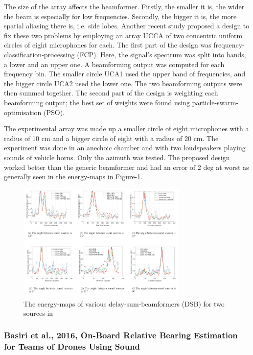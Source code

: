 \documentclass[notitlepage]{report}
\begin{document}
The size of the array affects the beamformer. Firstly, the smaller it is, the wider the beam is especially for low frequencies. Secondly, the bigger it is, the more spatial aliasing there is, i.e. side lobes. Another recent study \cite{zhang_improved_2021} proposed a design to fix these two problems by employing an array UCCA of two concentric uniform circles of eight microphones for each. The first part of the design was frequency-classification-processing (FCP). Here, the signal's spectrum was split into bands, a lower and an upper one. A beamforming output was computed for each frequency bin. The smaller circle UCA1 used the upper band of frequencies, and the bigger circle UCA2 used the lower one. The two beamforming outputs were then summed together. The second part of the design is weighting each beamforming output; the best set of weights were found using particle-swarm-optimisation (PSO). 

The experimental array was made up a smaller circle of eight microphones with a radius of 10 \si{cm} and a bigger circle of eight with a radius of 20 \si{cm}. The experiment was done in an anechoic chamber and with two loudspeakers playing sounds of vehicle horns. Only the azimuth was tested. The proposed design worked better than the generic beamformer and had an error of 2 \si{deg} at worst as generally seen in the energy-maps in Figure-\ref{fig:zhang_2021_maps}.

\begin{figure}[H]
\includegraphics[width=0.75\textwidth]{./zhang_2021/maps.png}
\centering
\caption{The energy-maps of various delay-sum-beamformers (DSB) for two sources in \cite{zhang_improved_2021}}
\label{fig:zhang_2021_maps}
\centering
\end{figure}

\subsubsection{Basiri et al., 2016, On-Board Relative Bearing Estimation for Teams of Drones Using Sound}
\end{document}
